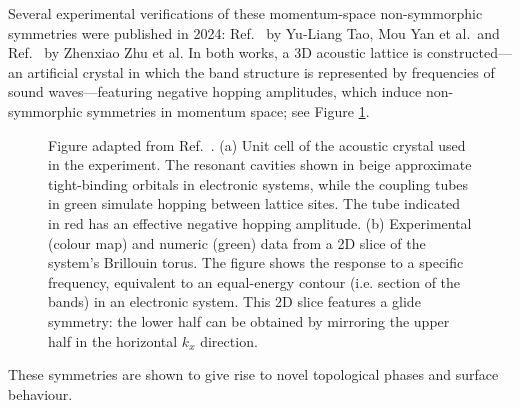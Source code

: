 Several experimental verifications of these momentum-space non-symmorphic symmetries were published in 2024: Ref.~\cite{TaoYan_acoustic-Klein} by Yu-Liang Tao, Mou Yan et al.\ and Ref.~\cite{Zhu_acoustic-Klein-halfturn} by Zhenxiao Zhu et al. In both works, a 3D acoustic lattice is constructed---an artificial crystal in which the band structure is represented by frequencies of sound waves---featuring negative hopping amplitudes, which induce non-symmorphic symmetries in momentum space; see Figure \ref{fig:acoustic-Klein}.
\begin{figure}[htb!]
	\centering
	\hfil
	\caption{Figure adapted	from Ref.~\cite{Zhu_acoustic-Klein-halfturn}. (a) Unit cell of the acoustic crystal used in the experiment. The resonant cavities shown in beige approximate tight-binding orbitals in electronic systems, while the coupling tubes in green simulate hopping between lattice sites. The tube indicated in red has an effective negative hopping amplitude. (b) Experimental (colour map) and numeric (green) data from a 2D slice of the system's Brillouin torus. The figure shows the response to a specific frequency, equivalent to an equal-energy contour (i.e. section of the bands) in an electronic system. This 2D slice features a glide symmetry: the lower half can be obtained by mirroring the upper half in the horizontal $k_x$ direction.}
	\label{fig:acoustic-Klein}
\end{figure}
These symmetries are shown to give rise to novel topological phases and surface behaviour.

